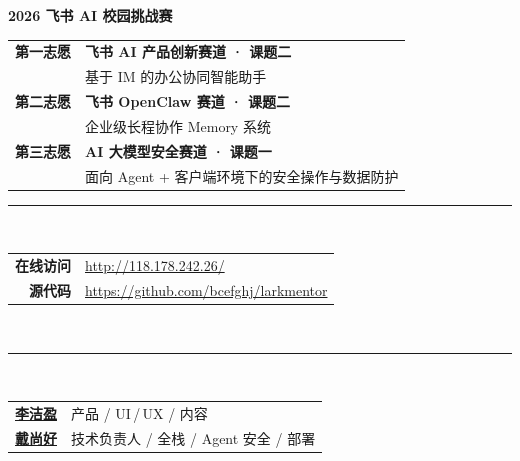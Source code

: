 \documentclass[11pt,a4paper]{ctexart}
\begin{document}
\thispagestyle{empty}
\vspace*{2cm}
\begin{center}

{\Large\bfseries\color{primary} 2026 飞书 AI 校园挑战赛}\\[1.4cm]

\begin{tcolorbox}[colback=lightbg,colframe=primary,arc=4pt,boxrule=0.5pt,width=0.92\textwidth,left=12pt,right=12pt,top=10pt,bottom=10pt]
\begin{tabular}{p{2.2cm}p{12cm}}
\textbf{第一志愿} & \textbf{飞书 AI 产品创新赛道 · 课题二}\\
& 基于 IM 的办公协同智能助手 \\[8pt]
\textbf{第二志愿} & \textbf{飞书 OpenClaw 赛道 · 课题二}\\
& 企业级长程协作 Memory 系统 \\[8pt]
\textbf{第三志愿} & \textbf{AI 大模型安全赛道 · 课题一}\\
& 面向 Agent + 客户端环境下的安全操作与数据防护 \\
\end{tabular}
\end{tcolorbox}

\vspace{1.8cm}

{\color{primary}\rule{0.55\textwidth}{0.6pt}}\\[1.4cm]

\large
\begin{tabular}{rl}
\textbf{在线访问} & \url{http://118.178.242.26/} \\[6pt]
\textbf{源代码} & \url{https://github.com/bcefghj/larkmentor} \\
\end{tabular}\\[1.8cm]

{\color{primary}\rule{0.55\textwidth}{0.6pt}}\\[1.4cm]

\normalsize
\begin{tabular}{rl}
\href{https://janeliii.netlify.app/}{\textbf{李洁盈}} & 产品 / UI\,/\,UX / 内容 \\[4pt]
\href{https://bcefghj.github.io}{\textbf{戴尚好}} & 技术负责人 / 全栈 / Agent 安全 / 部署 \\
\end{tabular}

\end{center}
\end{document}
